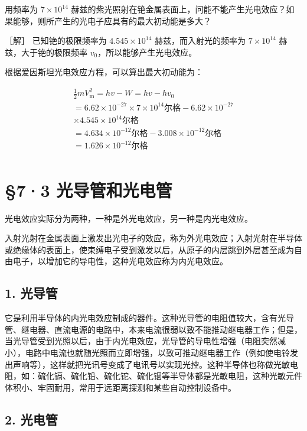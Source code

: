 用频率为 \(7 \times 10^{14}\)
赫兹的紫光照射在铯金属表面上，问能不能产生光电效应？如果能够，则所产生的光电子应具有的最大初动能是多大？

［解］ 已知铯的极限频率为 \(4.545 \times 10^{14}\)
赫兹，而入射光的频率为 \(7 \times 10^{14}\) 赫兹，大于铯的极限频率
\(v_{0}\)，所以能够产生光电效应。

根据爱因斯坦光电效应方程，可以算出最大初动能为：

\[
\begin{array}{l} \frac {1}{2} m V _ {\mathrm{m}} ^ {2} = h v - W = h v - h v _ {0} \\ = 6.62 \times 10 ^ {- 27} \times 7 \times 10 ^ {14} \text{尔格} - 6.62 \times 10 ^ {- 27} \\ \times 4.545 \times 10 ^ {14} \text{尔格} \\ = 4.634 \times 10 ^ {- 12} \text{尔格} - 3.008 \times 10 ^ {- 12} \text{尔格} \\ = 1.626 \times 10 ^ {- 12} \text{尔格} \\ \end{array}
\]

\section{§7·3
光导管和光电管}

光电效应实际分为两种，一种是外光电效应，另一种是内光电效应。

入射光射在金属表面上激发出光电子的效应，称为外光电效应；入射光射在半导体或绝缘体的表面上，使束缚电子受到激发以后，从原子的内层跳到外层甚至成为自由电子，以增加它的导电性，这种光电效应称为内光电效应。

\subsection{1. 光导管}

它是利用半导体的内光电效应制成的器件。这种光导管的电阻值较大，含有光导管、继电器、直流电源的电路中，本来电流很弱以致不能推动继电器工作；但是，当光导管受到光照以后，由于内光电效应，光导管的导电性增强（电阻突然减小），电路中电流也就随光照而立即增强，以致可推动继电器工作（例如使电铃发出声响等），这样就把光讯号变成了电讯号以实现光控。这种半导体也称做光敏电阻，如：硫化镉、硫化铅、硫化铊、硫化铟等半导体都是光敏电阻，这种光敏元件体积小、牢固耐用，常用于远距离探测和某些自动控制设备中。

\subsection{2. 光电管}


